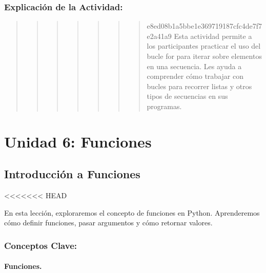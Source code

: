 \documentclass[
  a4paper,
  onepage,
  openany]{scrreprt}
\begin{document}
\hypertarget{explicaciuxf3n-de-la-actividad-41}{%
\section{Explicación de la
Actividad:}\label{explicaciuxf3n-de-la-actividad-41}}

\begin{quote}
\begin{quote}
\begin{quote}
\begin{quote}
\begin{quote}
\begin{quote}
\begin{quote}
e8ed08b1a5bbe1e369719187cfc4de7f7e2a41a9 Esta actividad permite a los
participantes practicar el uso del bucle for para iterar sobre elementos
en una secuencia. Les ayuda a comprender cómo trabajar con bucles para
recorrer listas y otros tipos de secuencias en sus programas.
\end{quote}
\end{quote}
\end{quote}
\end{quote}
\end{quote}
\end{quote}
\end{quote}

\part{Unidad 6: Funciones}

\hypertarget{introducciuxf3n-a-funciones}{%
\chapter{Introducción a Funciones}\label{introducciuxf3n-a-funciones}}

\textless\textless\textless\textless\textless\textless\textless{} HEAD

En esta lección, exploraremos el concepto de funciones en Python.
Aprenderemos cómo definir funciones, pasar argumentos y cómo retornar
valores.

\hypertarget{conceptos-clave-44}{%
\section{Conceptos Clave:}\label{conceptos-clave-44}}

\hypertarget{funciones.}{%
\subsection{Funciones.}\label{funciones.}}
\end{document}
